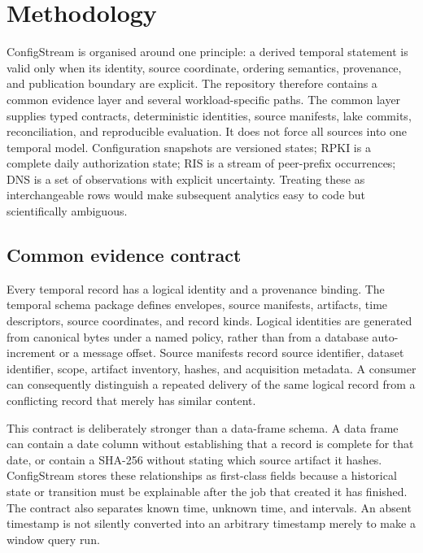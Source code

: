 \documentclass[a4paper,11pt]{article}
\begin{document}
\section{Methodology}
\label{sec:platform-method}

ConfigStream is organised around one principle: a derived temporal statement is valid only when its identity, source coordinate, ordering semantics, provenance, and publication boundary are explicit. The repository therefore contains a common evidence layer and several workload-specific paths. The common layer supplies typed contracts, deterministic identities, source manifests, lake commits, reconciliation, and reproducible evaluation. It does not force all sources into one temporal model. Configuration snapshots are versioned states; RPKI is a complete daily authorization state; RIS is a stream of peer-prefix occurrences; DNS is a set of observations with explicit uncertainty. Treating these as interchangeable rows would make subsequent analytics easy to code but scientifically ambiguous.

\subsection{Common evidence contract}

Every temporal record has a logical identity and a provenance binding. The temporal schema package defines envelopes, source manifests, artifacts, time descriptors, source coordinates, and record kinds. Logical identities are generated from canonical bytes under a named policy, rather than from a database auto-increment or a message offset. Source manifests record source identifier, dataset identifier, scope, artifact inventory, hashes, and acquisition metadata. A consumer can consequently distinguish a repeated delivery of the same logical record from a conflicting record that merely has similar content.

This contract is deliberately stronger than a data-frame schema. A data frame can contain a date column without establishing that a record is complete for that date, or contain a SHA-256 without stating which source artifact it hashes. ConfigStream stores these relationships as first-class fields because a historical state or transition must be explainable after the job that created it has finished. The contract also separates known time, unknown time, and intervals. An absent timestamp is not silently converted into an arbitrary timestamp merely to make a window query run.
\end{document}
